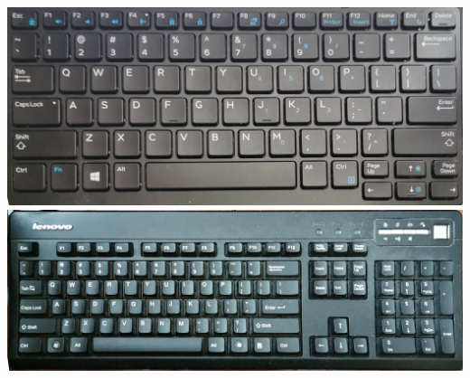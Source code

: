 \begin{center}
	\includegraphics[scale=0.06]{pic/KB1}\\\includegraphics[scale=0.06]{pic/KB2}
\end{center}\par
